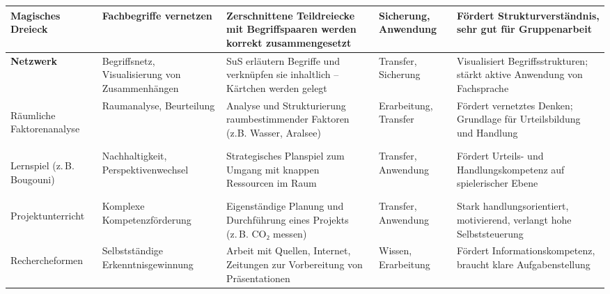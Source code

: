 \begin{landscape}
\begin{longtable}{>{\bfseries}p{3cm} p{3cm} p{6.5cm} p{3cm} p{6.5cm}}
Magisches \newline Dreieck &
Fachbegriffe vernetzen &
Zerschnittene Teildreiecke mit Begriffspaaren werden korrekt zusammengesetzt &
Sicherung, Anwendung &
Fördert Strukturverständnis, sehr gut für Gruppenarbeit \\
\midrule

Netzwerk &
Begriffsnetz, Visualisierung von Zusammenhängen &
SuS erläutern Begriffe und verknüpfen sie inhaltlich -- Kärtchen werden gelegt &
Transfer, Sicherung &
Visualisiert Begriffsstrukturen; stärkt aktive Anwendung von Fachsprache \\
\midrule

Räumliche \newline Faktorenanalyse &
Raumanalyse, Beurteilung &
Analyse und Strukturierung raumbestimmender Faktoren (z.B. Wasser, Aralsee) &
Erarbeitung, Transfer &
Fördert vernetztes Denken; Grundlage für Urteilsbildung und Handlung \\
\midrule

Lernspiel (z. B. Bougouni) &
Nachhaltigkeit, Perspektivenwechsel &
Strategisches Planspiel zum Umgang mit knappen Ressourcen im Raum &
Transfer, Anwendung &
Fördert Urteils- und Handlungskompetenz auf spielerischer Ebene \\
\midrule

Projektunterricht &
Komplexe Kompetenzförderung &
Eigenständige Planung und Durchführung eines Projekts (z. B. CO₂ messen) &
Transfer, Anwendung &
Stark handlungsorientiert, motivierend, verlangt hohe Selbststeuerung \\
\midrule

Rechercheformen &
Selbstständige Erkenntnisgewinnung &
Arbeit mit Quellen, Internet, Zeitungen zur Vorbereitung von Präsentationen &
Wissen, Erarbeitung &
Fördert Informationskompetenz, braucht klare Aufgabenstellung \\
\midrule

\end{longtable}

\end{landscape}

